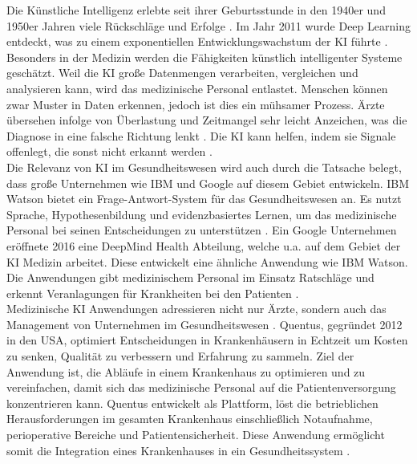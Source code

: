 Die Künstliche Intelligenz erlebte seit ihrer Geburtsstunde in den 1940er und 1950er Jahren viele Rückschläge und Erfolge \cite{Chapter_14}. Im Jahr 2011 wurde Deep Learning entdeckt, was zu einem exponentiellen Entwicklungswachstum der KI führte  \cite{Chapter_14}. 
Besonders in der Medizin werden die Fähigkeiten künstlich intelligenter Systeme geschätzt. Weil die KI große Datenmengen verarbeiten, vergleichen und analysieren kann, wird das medizinische Personal entlastet. Menschen können zwar Muster in Daten erkennen, jedoch ist dies ein mühsamer Prozess. Ärzte übersehen infolge von Überlastung und Zeitmangel sehr leicht Anzeichen, was die Diagnose in eine falsche Richtung lenkt \cite{Opportunities_challenges_ai_hc}. Die KI kann helfen, indem sie Signale offenlegt, die sonst nicht erkannt werden \cite{Opportunities_challenges_ai_hc}.\\

Die Relevanz von KI im Gesundheitswesen wird auch durch die Tatsache belegt, dass große Unternehmen wie IBM und Google auf diesem Gebiet entwickeln. IBM Watson bietet ein Frage-Antwort-System für das Gesundheitswesen an. Es nutzt Sprache, Hypothesenbildung und evidenzbasiertes Lernen, um das medizinische Personal bei seinen Entscheidungen zu unterstützen \cite{Opportunities_challenges_ai_hc}. Ein Google Unternehmen eröffnete 2016 eine DeepMind Health Abteilung, welche u.a. auf dem Gebiet der KI Medizin arbeitet. Diese entwickelt eine ähnliche Anwendung wie IBM Watson. Die Anwendungen gibt medizinischem Personal im Einsatz Ratschläge und erkennt Veranlagungen für Krankheiten bei den Patienten  \cite{Opportunities_challenges_ai_hc}.\\

Medizinische KI Anwendungen adressieren nicht nur Ärzte, sondern auch das Management von Unternehmen im Gesundheitswesen \cite{Opportunities_challenges_ai_hc}. Quentus, gegründet 2012 in den USA, optimiert Entscheidungen in Krankenhäusern in Echtzeit um Kosten zu senken, Qualität zu verbessern und Erfahrung zu sammeln. Ziel der Anwendung ist, die Abläufe in einem Krankenhaus zu optimieren und zu vereinfachen, damit sich das medizinische Personal auf die Patientenversorgung konzentrieren kann. Quentus entwickelt als Plattform, löst die betrieblichen Herausforderungen im gesamten Krankenhaus einschließlich Notaufnahme, perioperative Bereiche und Patientensicherheit. Diese Anwendung ermöglicht somit die Integration eines Krankenhauses in ein Gesundheitssystem \cite{Opportunities_challenges_ai_hc}.\\
 
